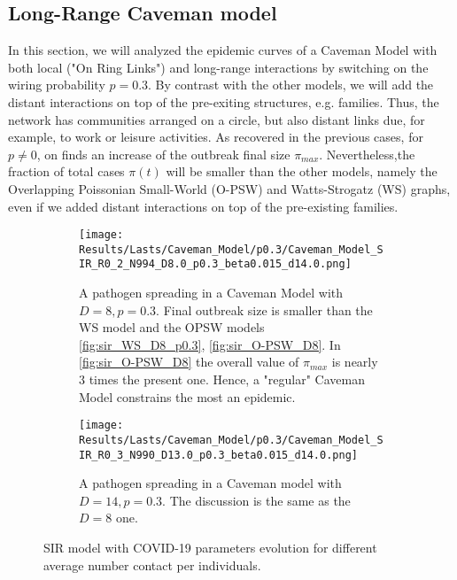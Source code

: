 \documentclass[a4paper,10pt,twoside]{book} %
\theoremstyle{definition}
\begin{document}
\clearpage
\subsection{Long-Range Caveman model}
\label{sec:res_LRCM}

In this section, we will analyzed the epidemic curves of a Caveman Model with both local ("On Ring Links") and long-range interactions by switching on the wiring probability $p = 0.3$. By contrast with the other models, we will add the distant interactions on top of the pre-exiting structures, e.g. families. Thus, the network has communities arranged on a circle, but also distant links due, for example, to work or leisure activities.
As recovered in the previous cases, for $ p \neq 0$, on finds an increase of the outbreak final size $ \pi_{max} $. Nevertheless,the fraction of total cases $\pi(t)$ will be smaller than the other models, namely the Overlapping Poissonian Small-World (O-PSW) and Watts-Strogatz (WS) graphs, even if we added distant interactions on top of the pre-existing families.
\begin{figure}[htbp]
	\centering
	\begin{subfigure}{0.9\linewidth}
		\texttt{[image: Results/Lasts/Caveman\_Model/p0.3/Caveman\_Model\_SIR\_R0\_2\_N994\_D8.0\_p0.3\_beta0.015\_d14.0.png]}
		\caption{A pathogen spreading in a Caveman Model with $D = 8, p = 0.3$. Final outbreak size is smaller than the WS model and the OPSW models \autoref{fig:sir_WS_D8_p0.3}, \autoref{fig:sir_O-PSW_D8}. In \autoref{fig:sir_O-PSW_D8} the overall value of $ \pi_{max}$ is nearly $3$ times the present one. Hence, a "regular" Caveman Model constrains the most an epidemic.}
		\label{fig:sir_CM_D8_p0.3}
	\end{subfigure}
	\par\smallskip
	\begin{subfigure}{0.9\linewidth}
		\texttt{[image: Results/Lasts/Caveman\_Model/p0.3/Caveman\_Model\_SIR\_R0\_3\_N990\_D13.0\_p0.3\_beta0.015\_d14.0.png]}
		\caption{A pathogen spreading in a Caveman model with $D = 14, p = 0.3$. The discussion is the same as the $ D = 8$ one.}
		\label{fig:sir_CM_D13_p0.3}
	\end{subfigure}
	\caption{SIR model with COVID-19 parameters evolution for different average number contact per individuals.}
	\label{fig:sir_CM_COVID_p0.3}
\end{figure}

\clearpage
\end{document}
